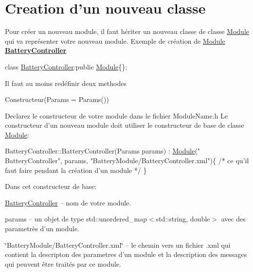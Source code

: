\hypertarget{docModule_classCreation}{}\section{Creation d'un nouveau classe}\label{docModule_classCreation}
Pour créer un nouveau module, il faut hériter un nouveau classe de classe \hyperlink{classModule}{Module} qui va représenter votre nouveau module. Exemple de création de \hyperlink{classModule}{Module} {\bfseries \hyperlink{classBatteryController}{Battery\-Controller}}

{\ttfamily class \hyperlink{classBatteryController}{Battery\-Controller}\-:public \hyperlink{classModule}{Module}\{\};}

Il faut au moins redéfinir deux methodes
\begin{DoxyItemize}
\item {\ttfamily Constructeur(Params = Params())}

Declarez le constructeur de votre module dans le fichier Module\-Name.\-h Le constructeur d'un nouveau module doit utiliser le constructeur de base de classe \hyperlink{classModule}{Module}\-:


\begin{DoxyCode}
BatteryController::BatteryController(Params params) : \hyperlink{classModule}{Module}(\textcolor{stringliteral}{"
      BatteryController"}, params, \textcolor{stringliteral}{"BatteryModule/BatteryController.xml"})\{
   \textcolor{comment}{/* ce qu'il faut faire pendant la création d'un module */}
\}
\end{DoxyCode}


Dans cet constructeur de base\-:
\begin{DoxyEnumerate}
\item \hyperlink{classBatteryController}{Battery\-Controller} – nom de votre module.
\item params – un objet de type {\ttfamily std\-::unordered\-\_\-map$<$std\-::string, double$>$} avec des parametrès d'un module.
\item \char`\"{}\-Battery\-Module/\-Battery\-Controller.\-xml\char`\"{} – le chemin vers un fichier {\ttfamily .xml} qui contient la descripton des parametres d'un module et la description des messages qui peuvent être traités par ce module.
\end{DoxyEnumerate}
\end{DoxyItemize}



